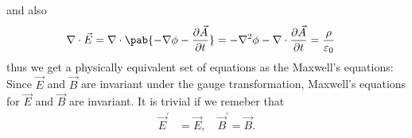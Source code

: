and also
\begin{align}
  \nabla \cdot \vec{E} & = \nabla \cdot \pab{- \nabla \phi - \pdv{\vec{A}}{t}} = - \nabla^2 \phi - \nabla \cdot \pdv{\vec{A}}{t} = \frac{\rho}{\varepsilon_0}
\end{align}
thus we get a physically equivalent set of equations as the Maxwell's equations:
Since $\vec{E}$ and $\vec{B}$ are invariant under the gauge transformation, Maxwell's equations for $\vec{E}$ and $\vec{B}$ are invariant.
It is trivial if we remeber that
\begin{align}
  \vec{E}^\prime & = \vec{E}, \quad \vec{B}^\prime = \vec{B}.
\end{align}



